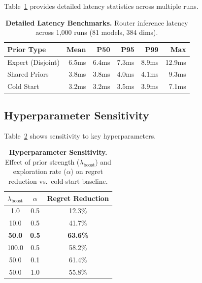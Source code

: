 Table~\ref{tab:latency_full} provides detailed latency statistics across multiple runs.

\begin{table}[h]
\centering
\footnotesize
\caption{\textbf{Detailed Latency Benchmarks.} Router inference latency across 1,000 runs (81 models, 384 dims).}
\label{tab:latency_full}
\begin{tabular}{lrrrrr}
\toprule
\textbf{Prior Type} & \textbf{Mean} & \textbf{P50} & \textbf{P95} & \textbf{P99} & \textbf{Max} \\
\midrule
Expert (Disjoint) & 6.5ms & 6.4ms & 7.3ms & 8.9ms & 12.9ms \\
Shared Priors & 3.8ms & 3.8ms & 4.0ms & 4.1ms & 9.3ms \\
Cold Start & 3.2ms & 3.2ms & 3.5ms & 3.9ms & 7.1ms \\
\bottomrule
\end{tabular}
\end{table}

\subsection{Hyperparameter Sensitivity}

Table~\ref{tab:hyperparams} shows sensitivity to key hyperparameters.

\begin{table}[h]
\centering
\small
\caption{\textbf{Hyperparameter Sensitivity.} Effect of prior strength ($\lambda_{\text{boost}}$) and exploration rate ($\alpha$) on regret reduction vs.\ cold-start baseline.}
\label{tab:hyperparams}
\begin{tabular}{ccc}
\toprule
$\lambda_{\text{boost}}$ & $\alpha$ & \textbf{Regret Reduction} \\
\midrule
1.0 & 0.5 & 12.3\% \\
10.0 & 0.5 & 41.7\% \\
\textbf{50.0} & \textbf{0.5} & \textbf{63.6\%} \\
100.0 & 0.5 & 58.2\% \\
50.0 & 0.1 & 61.4\% \\
50.0 & 1.0 & 55.8\% \\
\bottomrule
\end{tabular}
\end{table}


